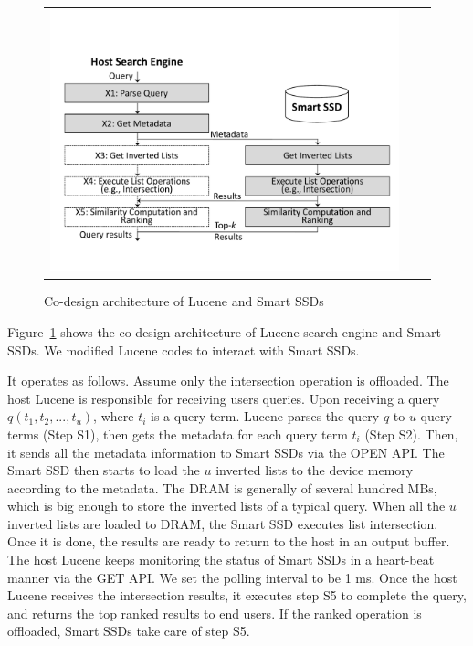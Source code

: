 \begin{figure}[htbp]
  \centering
  \begin{tabular}{ccc}
 \includegraphics[width=1.0\columnwidth]{figures/SmartSSDLucene.pdf}
\end{tabular}
  \caption{Co-design architecture of Lucene and Smart SSDs}
  \label{fig:SmartSSDLucene}
 \end{figure}

Figure~\ref{fig:SmartSSDLucene} shows the co-design architecture of Lucene search engine and Smart SSDs. We modified Lucene codes to interact with Smart SSDs.

It operates as follows. Assume only the \textsf{intersection} operation is offloaded. The host Lucene is responsible for receiving users queries. Upon receiving a query $q(t_1,t_2,...,t_u)$, where $t_i$ is a query term. Lucene parses the query $q$ to $u$ query terms (Step S1), then gets the metadata for each query term $t_i$ (Step S2). Then, it sends all the metadata information to Smart SSDs via the OPEN API.
The Smart SSD then starts to load the $u$ inverted lists to the device memory according to the metadata. The DRAM is generally of several hundred MBs, which is big enough to store the inverted lists of a typical query.
When all the $u$ inverted lists are loaded to DRAM, the Smart SSD executes list intersection. Once it is done, the results are ready to return to the host in an output buffer.
The host Lucene keeps monitoring the status of Smart SSDs in a heart-beat manner via the GET API. We set the polling interval to be 1 ms. Once the host Lucene receives the intersection results, it executes step S5 to complete the query, and returns the top ranked results to end users. If the ranked operation is offloaded, Smart SSDs take care of step S5.
